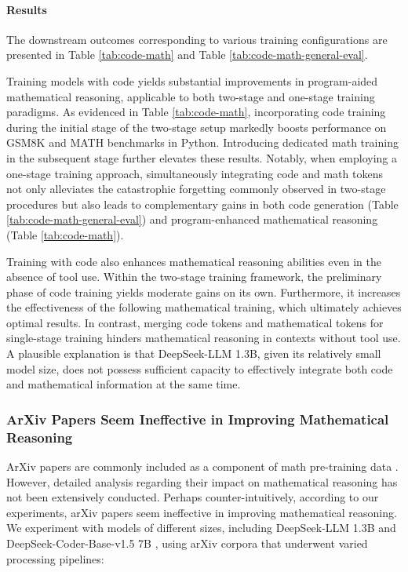 \begin{itemize}[topsep=0pt]
\begin{itemize}[topsep=0pt]
\paragraph{Results}
The downstream outcomes corresponding to various training configurations are presented in Table \ref{tab:code-math} and Table \ref{tab:code-math-general-eval}.

Training models with code yields substantial improvements in program-aided mathematical reasoning, applicable to both two-stage and one-stage training paradigms. As evidenced in Table \ref{tab:code-math}, incorporating code training during the initial stage of the two-stage setup markedly boosts performance on GSM8K and MATH benchmarks in Python. Introducing dedicated math training in the subsequent stage further elevates these results. Notably, when employing a one-stage training approach, simultaneously integrating code and math tokens not only alleviates the catastrophic forgetting commonly observed in two-stage procedures but also leads to complementary gains in both code generation (Table \ref{tab:code-math-general-eval}) and program-enhanced mathematical reasoning (Table \ref{tab:code-math}).

Training with code also enhances mathematical reasoning abilities even in the absence of tool use. Within the two-stage training framework, the preliminary phase of code training yields moderate gains on its own. Furthermore, it increases the effectiveness of the following mathematical training, which ultimately achieves optimal results. In contrast, merging code tokens and mathematical tokens for single-stage training hinders mathematical reasoning in contexts without tool use. A plausible explanation is that DeepSeek-LLM 1.3B, given its relatively small model size, does not possess sufficient capacity to effectively integrate both code and mathematical information at the same time.

\subsubsection{ArXiv Papers Seem Ineffective in Improving Mathematical Reasoning}

ArXiv papers are commonly included as a component of math pre-training data \citep{minerva,gpt-f,llemma,mathpile}. However, detailed analysis regarding their impact on mathematical reasoning has not been extensively conducted. Perhaps counter-intuitively, according to our experiments, arXiv papers seem ineffective in improving mathematical reasoning. We experiment with models of different sizes, including DeepSeek-LLM 1.3B and DeepSeek-Coder-Base-v1.5 7B \citep{deepseek-coder}, using arXiv corpora that underwent varied processing pipelines:


\end{itemize}
\end{itemize}
